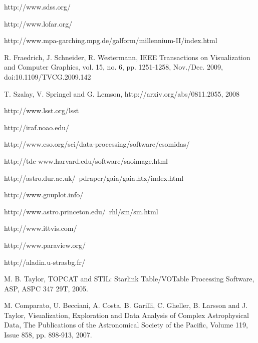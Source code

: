 \documentclass[1p,times]{elsarticle}
\begin{document}
\begin{thebibliography}{00}








 http://www.sdss.org/

 http://www.lofar.org/

http://www.mpa-garching.mpg.de/galform/millennium-II/index.html

R. Fraedrich, J. Schneider, R. Westermann, 
IEEE Transactions on Visualization and Computer Graphics, vol. 15, no. 6, pp. 1251-1258, 
Nov./Dec. 2009, doi:10.1109/TVCG.2009.142

T. Szalay, V. Springel and G. Lemson, http://arxiv.org/abs/0811.2055, 2008

http://www.lsst.org/lsst

 http://iraf.noao.edu/

 http://www.eso.org/sci/data-processing/software/esomidas/

 http://tdc-www.harvard.edu/software/saoimage.html

 http://astro.dur.ac.uk/~pdraper/gaia/gaia.htx/index.html

 http://www.gnuplot.info/

 http://www.astro.princeton.edu/~rhl/sm/sm.html

 http://www.ittvis.com/


 http://www.paraview.org/

 http://aladin.u-strasbg.fr/

 M. B. Taylor, TOPCAT and STIL: Starlink Table/VOTable Processing Software, ASP, ASPC 347 29T, 2005.

M. Comparato, U. Becciani, A. Costa, B. Garilli, C. Gheller, B. Larsson and J. Taylor, Visualization, Exploration and Data Analysis of Complex Astrophysical Data,  The Publications of the Astronomical Society of the Pacific, Volume 119, Issue 858, pp. 898-913, 2007.


\end{thebibliography}
\end{document}

